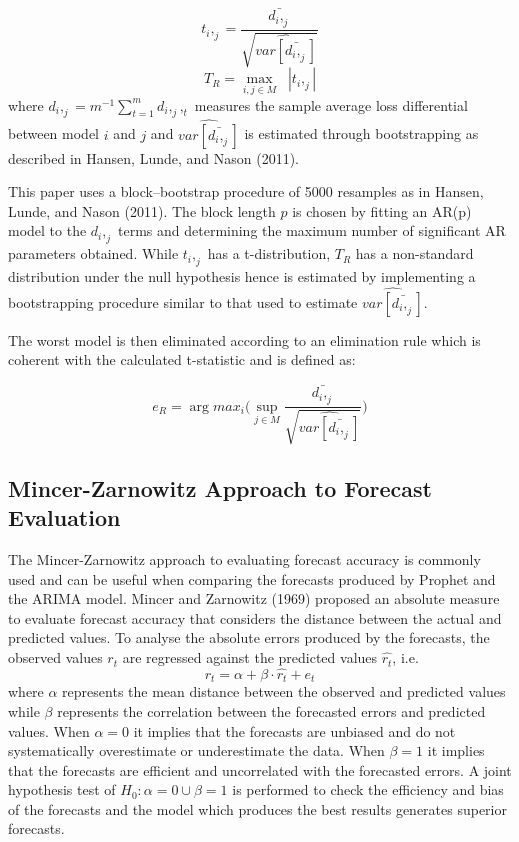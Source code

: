 \documentclass[12pt,a4paper]{article}
\numberwithin{equation}{section}
\numberwithin{figure}{section}
\numberwithin{table}{section}
\begin{document}
\[t_i,_j = \frac{\bar{d_i,_j}}{\sqrt{\hat{var[\bar{d_i,_j}]}}}\]
\vspace{1pt} \[ T_R = \max_{i,j\in M} \;\; |t_i,_j|\] where
\(d_i,_j = m^{-1}\sum_{t=1}^{m}{d_i,_j,_t }\) measures the sample
average loss differential between model \(i\) and \(j\) and
\(\hat{var[\bar{d_i,_j}]}\) is estimated through bootstrapping as
described in Hansen, Lunde, and Nason (2011).

This paper uses a block--bootstrap procedure of 5000 resamples as in
Hansen, Lunde, and Nason (2011). The block length \(p\) is chosen by
fitting an AR(p) model to the \(d_i,_j\) terms and determining the
maximum number of significant AR parameters obtained. While \(t_i,_j\)
has a t-distribution, \(T_R\) has a non-standard distribution under the
null hypothesis hence is estimated by implementing a bootstrapping
procedure similar to that used to estimate \(\hat{var[\bar{d_i,_j}]}\).

The worst model is then eliminated according to an elimination rule
which is coherent with the calculated t-statistic and is defined as:

\[e_R = \arg max_{i}\bigg(\sup_{j\in M}\frac{\bar{d_i,_j}}{\sqrt{\hat{var[\bar{d_i,_j}]}}}\bigg)\]

\subsection{Mincer-Zarnowitz Approach to Forecast
Evaluation}\label{mincer-zarnowitz-approach-to-forecast-evaluation}

The Mincer-Zarnowitz approach to evaluating forecast accuracy is
commonly used and can be useful when comparing the forecasts produced by
Prophet and the ARIMA model. Mincer and Zarnowitz (1969) proposed an
absolute measure to evaluate forecast accuracy that considers the
distance between the actual and predicted values. To analyse the
absolute errors produced by the forecasts, the observed values \(r_t\)
are regressed against the predicted values \(\hat{r_t}\), i.e.
\[r_t = \alpha + \beta\cdot\hat{r_t} + e_t\] where \(\alpha\) represents
the mean distance between the observed and predicted values while
\(\beta\) represents the correlation between the forecasted errors and
predicted values. When \(\alpha = 0\) it implies that the forecasts are
unbiased and do not systematically overestimate or underestimate the
data. When \(\beta = 1\) it implies that the forecasts are efficient and
uncorrelated with the forecasted errors. A joint hypothesis test of
\(H_0: \alpha = 0 \cup \beta = 1\) is performed to check the efficiency
and bias of the forecasts and the model which produces the best results
generates superior forecasts.
\end{document}

